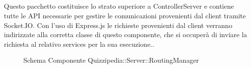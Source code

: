 \subsection{}
Questo pacchetto costituisce lo strato superiore a ControllerServer e contiene tutte le API necessarie per gestire le comunicazioni provenienti dal client tramite Socket.IO. 
Con l'uso di Express.js le richieste provenienti dal client verranno indirizzate alla corretta classe di questo componente, che si occuperà di inviare la richiesta al relativo services per la sua esecuzione..
\begin{figure}[H]
\centering
\noindent{}
\caption[Schema Componente Quizzipedia::Server::RoutingManager]{Schema Componente Quizzipedia::Server::RoutingManager}
\end{figure}
